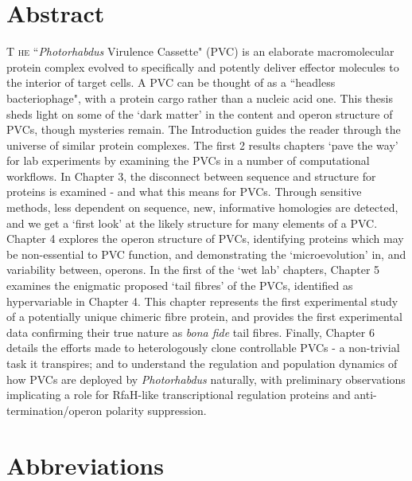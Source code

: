 \documentclass[a4paper, oneside, 11pt]{report} %
\begin{document}
\chapter*{Abstract}
\lettrine[lraise=0.0, nindent=0.1em, slope=1em]{T}{ he} ``\emph{Photorhabdus} Virulence Cassette" (PVC) is an elaborate macromolecular protein complex evolved to specifically and potently deliver effector molecules to the interior of target cells. A PVC can be thought of as a ``headless bacteriophage", with a protein cargo rather than a nucleic acid one. This thesis sheds light on some of the `dark matter' in the content and operon structure of PVCs, though mysteries remain. The Introduction guides the reader through the universe of similar protein complexes. The first 2 results chapters `pave the way' for lab experiments by examining the PVCs in a number of computational workflows. In Chapter 3, the disconnect between sequence and structure for proteins is examined - and what this means for PVCs. Through sensitive methods, less dependent on sequence, new, informative homologies are detected, and we get a `first look' at the likely structure for many elements of a PVC. Chapter 4 explores the operon structure of PVCs, identifying proteins which may be non-essential to PVC function, and demonstrating the `microevolution' in, and variability between, operons. In the first of the `wet lab' chapters, Chapter 5 examines the enigmatic proposed `tail fibres' of the PVCs, identified as hypervariable in Chapter 4. This chapter represents the first experimental study of a potentially unique chimeric fibre protein, and provides the first experimental data confirming their true nature as \emph{bona fide} tail fibres. Finally, Chapter 6 details the efforts made to heterologously clone controllable PVCs - a non-trivial task it transpires; and to understand the regulation and population dynamics of how PVCs are deployed by \emph{Photorhabdus} naturally, with preliminary observations implicating a role for RfaH-like transcriptional regulation proteins and anti-termination/operon polarity suppression.

\newpage

\chapter*{Abbreviations}
\rhead{\textsf{}}
\end{document}
